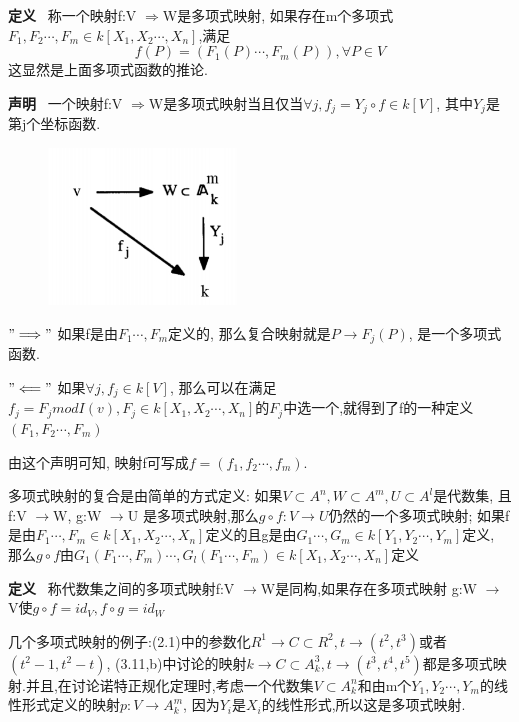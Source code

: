 \documentclass[UTF8]{book}
\begin{document}
		\textbf{定义} \ 称一个映射f:V $\Rightarrow $W是多项式映射, 如果存在m个多项式$F_{1},F_{2}\cdots,F_{m}\in k[X_{1},X_{2}\cdots,X_{n}]$,满足
		\begin{equation*}
		f(P)=(F_{1}(P)\cdots,F_{m}(P)), \forall  P\in V
		\end{equation*}
		这显然是上面多项式函数的推论.

		\textbf{声明} \ 一个映射f:V $\Rightarrow $W是多项式映射当且仅当$\forall  j, f_{j}=Y_{j}\circ f \in k[V]$, 其中$Y_{j}$是第j个坐标函数.
		\begin{figure}[h]
		  \centering
		  \includegraphics[width=5cm]{68.jpg}\\
		\end{figure}


		$"\Longrightarrow"$
		如果f是由$F_{1}\cdots,F_{m}$定义的, 那么复合映射就是$P\rightarrow F_{j}(P)$, 是一个多项式函数.

		$"\Longleftarrow"$
		如果$\forall  j, f_{j}\in k[V] $, 那么可以在满足$f_{j}=F_{j} mod I(v), F_{j}\in k[X_{1},X_{2}\cdots,X_{n}]$的$F_{j}$中选一个,就得到了f的一种定义$(F_{1},F_{2}\cdots,F_{m})$

		由这个声明可知, 映射f可写成$f=(f_{1},f_{2}\cdots,f_{m})$.

		多项式映射的复合是由简单的方式定义: 如果$V\subset A^{n}, W\subset A^{m}, U\subset A^{l}$是代数集, 且f:V $\rightarrow $W, g:W $\rightarrow $U 是多项式映射,那么$g\circ f :V \rightarrow U$仍然的一个多项式映射; 如果f是由$F_{1}\cdots,F_{m}\in k[X_{1},X_{2}\cdots,X_{n}]$定义的且g是由$G_{1}\cdots,G_{m}\in k[Y_{1},Y_{2}\cdots,Y_{m}]$定义, 那么$g\circ f$由$G_{1}(F_{1}\cdots,F_{m})\cdots,G_{l}(F_{1}\cdots,F_{m})\in k[X_{1},X_{2}\cdots,X_{n}]$定义

		\textbf{定义} \ 称代数集之间的多项式映射f:V $\rightarrow $W是同构,如果存在多项式映射 g:W $\rightarrow $V使$g\circ f=id_{V}, f\circ g=id_{W}$

		几个多项式映射的例子:(2.1)中的参数化$R^{1}\rightarrow C\subset R^{2}, t\rightarrow (t^{2},t^{3})$或者$(t^{2}-1,t^{2}-t)$, (3.11,b)中讨论的映射$k\rightarrow C\subset A^{3}_{k}, t\rightarrow (t^{3},t^{4},t^{5})$都是多项式映射.并且,在讨论诺特正规化定理时,考虑一个代数集$V\subset A^{n}_{k}$和由m个$Y_{1},Y_{2}\cdots,Y_{m}$的线性形式定义的映射$p:V\rightarrow A^{m}_{k}$, 因为$Y_{i}$是$X_{i}$的线性形式,所以这是多项式映射.
\end{document}
